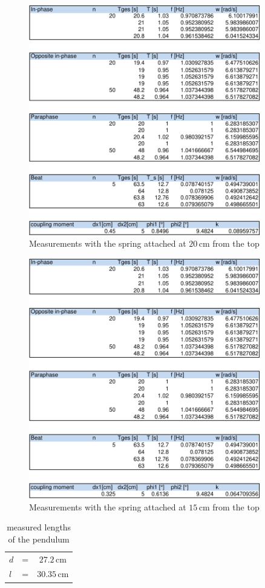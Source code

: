 \documentclass{scrreprt}
\newcommand{\unit}[1]{\ensuremath{\, \mathrm{#1}}}
\begin{document}
\begin{figure}[H]
	\centering
  \includegraphics[width=0.9\textwidth]{diag/readings20cm.pdf}
	\caption{Measurements with the spring attached at $20\unit{cm}$ from the top}
	\label{fig:20cm}
\end{figure}

\begin{figure}[H]
	\centering
  \includegraphics[width=0.9\textwidth]{diag/readings15cm.pdf}
	\caption{Measurements with the spring attached at $15\unit{cm}$ from the top}
	\label{fig:15cm}
\end{figure}
\begin{table}[H]
	\centering
	\begin{tabular}{|lcc|}
		\hline
		$d$&=&$27.2\unit{cm}$\\
		$l$&=&$30.35\unit{cm}$\\
		\hline
	\end{tabular}
	\caption{measured lengths of the pendulum}
\end{table}
\end{document}
